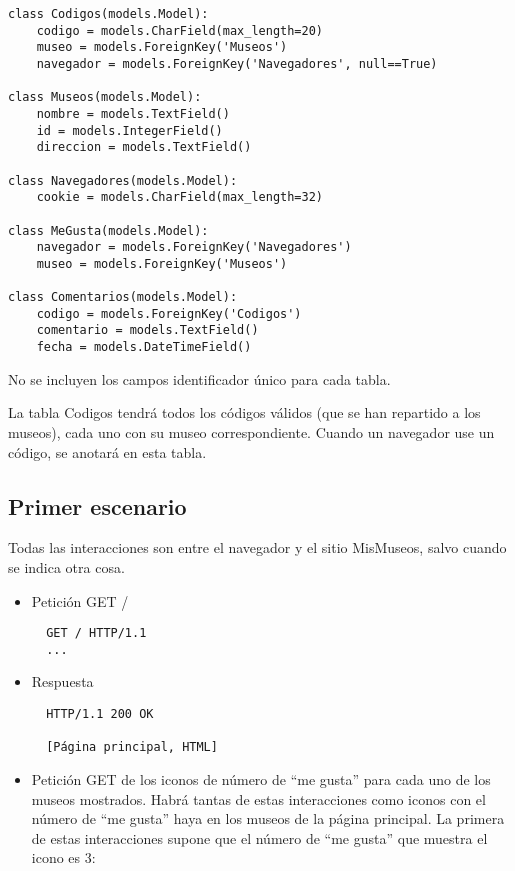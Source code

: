 {\begin{verbatim}
class Codigos(models.Model):
    codigo = models.CharField(max_length=20)
    museo = models.ForeignKey('Museos')
    navegador = models.ForeignKey('Navegadores', null==True)

class Museos(models.Model):
    nombre = models.TextField()
    id = models.IntegerField()
    direccion = models.TextField()

class Navegadores(models.Model):
    cookie = models.CharField(max_length=32)

class MeGusta(models.Model):
    navegador = models.ForeignKey('Navegadores')
    museo = models.ForeignKey('Museos')

class Comentarios(models.Model):
    codigo = models.ForeignKey('Codigos')
    comentario = models.TextField()
    fecha = models.DateTimeField()
\end{verbatim}

No se incluyen los campos identificador único para cada tabla.

La tabla Codigos tendrá todos los códigos válidos (que se han repartido a los museos), cada uno con su museo correspondiente. Cuando un navegador use un código, se anotará en esta tabla.

\subsection*{Primer escenario}

Todas las interacciones son entre el navegador y el sitio MisMuseos, salvo cuando se indica otra cosa.

\begin{itemize}
\item Petición GET /

\begin{verbatim}
  GET / HTTP/1.1
  ...
\end{verbatim}

\item Respuesta

\begin{verbatim}
  HTTP/1.1 200 OK

  [Página principal, HTML]
\end{verbatim}


\item Petición GET de los iconos de número de ``me gusta'' para cada uno de los museos mostrados. Habrá tantas de estas interacciones como iconos con el número de ``me gusta'' haya en los museos de la página principal. La primera de estas interacciones supone que el número de ``me gusta'' que muestra el icono es 3:


\end{itemize}}
